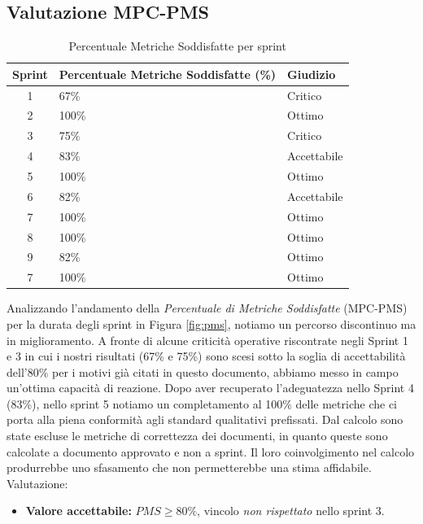 \documentclass[a4paper, 10pt, colorlinks=true, linkcolor=black, urlcolor=blue, citecolor=blue, hidelinks]{article}
\begin{document}
\subsection{Valutazione MPC-PMS}
\begin{table}[H]
    \centering
	\begin{tabular}{|c|l|p{3cm}|}
		\hline
		\textbf{Sprint} & \textbf{Percentuale Metriche Soddisfatte (\%)} & \textbf{Giudizio} \\
		\hline
		1 & 67\% & Critico\\ 
		\hline
        2 & 100\% & Ottimo \\
        \hline
        3 & 75\% & Critico \\
        \hline
        4 & 83\% & Accettabile \\
        \hline
        5 & 100\% & Ottimo  \\
        \hline
        6 & 82\%& Accettabile \\
        \hline
        7 & 100\% & Ottimo \\
        \hline
        8 & 100\% & Ottimo \\
        \hline
        9 & 82\% & Ottimo \\
        \hline
        7 & 100\% & Ottimo \\
        \hline
	\end{tabular}
	\caption{Percentuale Metriche Soddisfatte per sprint}
	\label{tab:pms}
\end{table}

Analizzando l'andamento della \textit{Percentuale di Metriche Soddisfatte} (MPC-PMS) per la durata degli sprint in Figura \ref{fig:pms}, notiamo un percorso discontinuo ma in miglioramento. A fronte di alcune criticità operative riscontrate negli Sprint 1 e 3 in cui i nostri risultati (67\% e 75\%) sono scesi sotto la soglia di accettabilità dell'80\% per i motivi già citati in questo documento, abbiamo messo in campo un'ottima capacità di reazione. Dopo aver recuperato l'adeguatezza nello Sprint 4 (83\%), nello sprint 5 notiamo un completamento al 100\% delle metriche che ci porta alla piena conformità agli standard qualitativi prefissati. 
Dal calcolo sono state escluse le metriche di correttezza dei documenti, in quanto queste sono calcolate a documento approvato e non a sprint. Il loro coinvolgimento nel calcolo produrrebbe uno sfasamento che non permetterebbe una stima affidabile. Valutazione:
\begin{itemize}
    \item \textbf{Valore accettabile:} $PMS \geq 80\%$, vincolo \textit{non rispettato} nello sprint 3.
\end{itemize}
\end{document}
